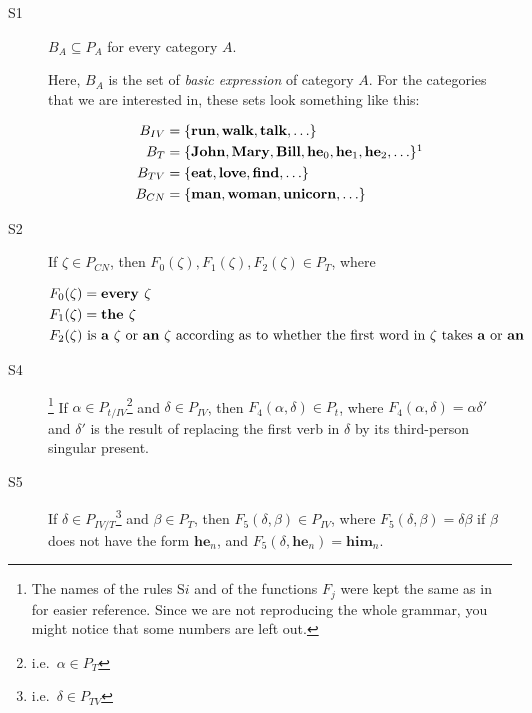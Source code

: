 \begin{description}
\item[S1] $B_A \subseteq P_A$ for every category $A$.

  Here, $B_A$ is the set of \emph{basic expression} of category $A$. For
  the categories that we are interested in, these sets look something like
  this:

  \begin{align*}
    B_{IV} &= \{ \textbf{run}, \textbf{walk}, \textbf{talk}, \ldots \} \\
    B_{T} &= \{ \textbf{John}, \textbf{Mary}, \textbf{Bill}, \textbf{he}_0,
            \textbf{he}_1, \textbf{he}_2, \ldots \}\footnotemark \\
    B_{TV} &= \{ \textbf{eat}, \textbf{love}, \textbf{find}, \ldots \} \\
    B_{CN} &= \{ \textbf{man}, \textbf{woman}, \textbf{unicorn}, \ldots \}
  \end{align*}


\item[S2] If $\zeta \in P_{CN}$, then
  $F_0(\zeta), F_1(\zeta), F_2(\zeta) \in P_{T}$, where

  \begin{align*}
    F_0(\zeta) &= \textbf{every } \zeta \\
    F_1(\zeta) &= \textbf{the } \zeta \\
    F_2(\zeta) &\text{ is \textbf{a} $\zeta$ or \textbf{an} $\zeta$ according
    as to whether the first word in $\zeta$ takes \textbf{a} or \textbf{an}}
  \end{align*}

\item[S4]\footnote{The names of the rules S$i$ and of the functions $F_j$
    were kept the same as in~\cite{montague1973proper} for easier
    reference. Since we are not reproducing the whole grammar, you might
    notice that some numbers are left out.} If
  $\alpha \in P_{t / IV}$\footnote{i.e.\ $\alpha \in P_{T}$} and
  $\delta \in P_{IV}$, then $F_4(\alpha, \delta) \in P_{t}$, where
  $F_4(\alpha, \delta) = \alpha \delta'$ and $\delta'$ is the result of
  replacing the first verb in $\delta$ by its third-person singular
  present.

\item[S5] If $\delta \in P_{IV / T}$\footnote{i.e.\ $\delta \in P_{TV}$}
  and $\beta \in P_{T}$, then $F_5(\delta, \beta) \in P_{IV}$, where
  $F_5(\delta, \beta) = \delta \beta$ if $\beta$ does not have the form
  $\textbf{he}_n$, and $F_5(\delta, \textbf{he}_n) = \textbf{him}_n$.


\end{description}
